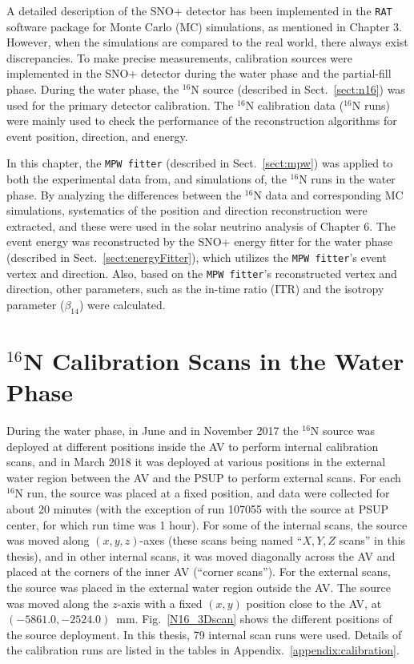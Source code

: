 A detailed description of the SNO+ detector has been implemented in the \texttt{RAT} software package for Monte Carlo (MC) simulations, as mentioned in Chapter 3. However, when the simulations are compared to the real world, there always exist discrepancies. To make precise measurements, calibration sources were implemented in the SNO+ detector during the water phase and the partial-fill phase. During the water phase, the $^{16}$N source (described in Sect.~\ref{sect:n16}) was used for the primary detector calibration. The $^{16}$N calibration data ($^{16}$N runs) were mainly used to check the performance of the reconstruction algorithms for event position, direction, and energy. 

In this chapter, the \texttt{MPW fitter} (described in Sect.~\ref{sect:mpw}) was applied to both the experimental data from, and simulations of, the $^{16}$N runs in the water phase. By analyzing the differences between the $^{16}$N data and corresponding MC simulations, systematics of the position and direction reconstruction were extracted, and these were used in the solar neutrino analysis of Chapter 6. The event energy was reconstructed by the SNO+ energy fitter for the water phase (described in Sect.~\ref{sect:energyFitter}), which utilizes the \texttt{MPW fitter}'s event vertex and direction. Also, based on the \texttt{MPW fitter}'s reconstructed vertex and direction, other parameters, such as the in-time ratio (ITR) and the isotropy parameter ($\beta_{14}$) were calculated.

\section{$^{16}${N} Calibration Scans in the Water Phase}\label{sect:n16_water}

During the water phase, in June and in November 2017 the $^{16}$N source was deployed at different positions inside the AV to perform internal calibration scans, and in March 2018 it was deployed at various positions in the external water region between the AV and the PSUP to perform external scans. For each $^{16}$N run, the source was placed at a fixed position, and data were collected for about 20 minutes (with the exception of run 107055 with the source at PSUP center, for which run time was 1 hour). For some of the internal scans, the source was moved along $(x,y,z)$-axes (these scans being named ``$X, Y, Z$ scans'' in this thesis), and in other internal scans, it was moved diagonally across the AV and placed at the corners of the inner AV (``corner scans''). For the external scans, the source was placed in the external water region outside the AV. The source was moved along the $z$-axis with a fixed $(x,y)$ position close to the AV, at $(-5861.0,-2524.0)$~mm. Fig.~\ref{N16_3Dscan} shows the different positions of the source deployment. In this thesis, 79 internal scan runs were used. Details of the calibration runs are listed in the tables in Appendix.~\ref{appendix:calibration}. %

